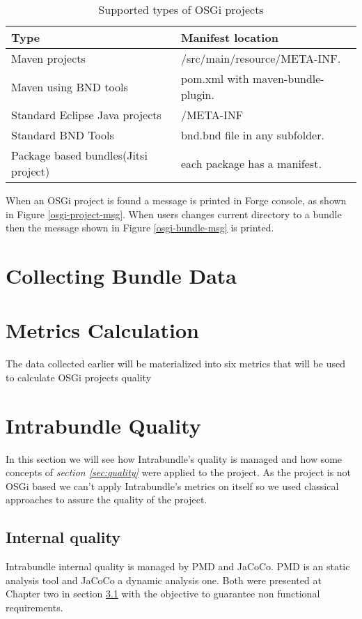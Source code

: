 \begin{table}[h]
\caption{Supported types of OSGi projects}
\label{osgi-project-type}
\begin{center}
    \begin{tabular}{  p{4cm} | p{6cm} }
    \hline
    Type & Manifest location \\  \hline
    Maven projects & /src/main/resource/META-INF.\\ \hline
    Maven using BND tools & pom.xml with maven-bundle-plugin.\\ \hline
    Standard Eclipse Java projects & /META-INF\\ \hline
    Standard BND Tools & bnd.bnd file in any subfolder.\\ \hline
    Package based bundles(Jitsi project) & each package has a manifest.\\ \hline
    \hline

    \end{tabular}
\end{center}
\end{table}


When an OSGi project is found a message is printed in Forge console, as shown in Figure \ref{osgi-project-msg}. When users changes current directory to a bundle then the message shown in Figure \ref{osgi-bundle-msg} is printed.

\section{Collecting Bundle Data}


\section{Metrics Calculation}
The data collected earlier will be materialized into six metrics that will be used to calculate OSGi projects quality  

\section{Intrabundle Quality}
In this section we will see how Intrabundle's quality is managed and how some concepts of \textit{section \ref{sec:quality}} were applied to the project. As the project is not OSGi based we can't apply Intrabundle's metrics on itself so we used classical approaches to assure the quality of the project.

\subsection{Internal quality}
Intrabundle internal quality is managed by PMD and JaCoCo. PMD is an static analysis tool and JaCoCo a dynamic analysis one. Both were presented at Chapter two in section \ref{} with the objective to guarantee non functional requirements.

